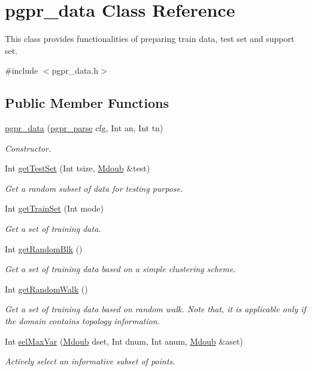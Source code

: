 \hypertarget{classpgpr__data}{\section{pgpr\-\_\-data Class Reference}
\label{classpgpr__data}
}


This class provides functionalities of preparing train data, test set and support set.  




{\ttfamily \#include $<$pgpr\-\_\-data.\-h$>$}

\subsection*{Public Member Functions}
\begin{DoxyCompactItemize}
\item 
\hyperlink{classpgpr__data_aa6879cea28bfba9c8a3fbd87df02a92c}{pgpr\-\_\-data} (\hyperlink{classpgpr__parse}{pgpr\-\_\-parse} cfg, Int an, Int tn)
\begin{DoxyCompactList}\small\item\em Constructor. \end{DoxyCompactList}\item 
Int \hyperlink{classpgpr__data_accb6162698eefa8c8826205a21ad18ab}{get\-Test\-Set} (Int tsize, \hyperlink{classpgpr__matrix}{Mdoub} \&test)
\begin{DoxyCompactList}\small\item\em Get a random subset of data for testing purpose. \end{DoxyCompactList}\item 
Int \hyperlink{classpgpr__data_aa826857a19458c7ec5dde1b9109f3b07}{get\-Train\-Set} (Int mode)
\begin{DoxyCompactList}\small\item\em Get a set of training data. \end{DoxyCompactList}\item 
Int \hyperlink{classpgpr__data_a569dc41fa124c739d28d05d56874d4c4}{get\-Random\-Blk} ()
\begin{DoxyCompactList}\small\item\em Get a set of training data based on a simple clustering scheme. \end{DoxyCompactList}\item 
Int \hyperlink{classpgpr__data_a1b0b0b000a221c160339ea4207910753}{get\-Random\-Walk} ()
\begin{DoxyCompactList}\small\item\em Get a set of training data based on random walk. Note that, it is applicable only if the domain contains topology information. \end{DoxyCompactList}\item 
Int \hyperlink{classpgpr__data_accef69857141cfa9e7b415edab6e2899}{sel\-Max\-Var} (\hyperlink{classpgpr__matrix}{Mdoub} dset, Int dnum, Int anum, \hyperlink{classpgpr__matrix}{Mdoub} \&aset)
\begin{DoxyCompactList}\small\item\em Actively select an informative subset of points. \end{DoxyCompactList}\end{DoxyCompactItemize}
